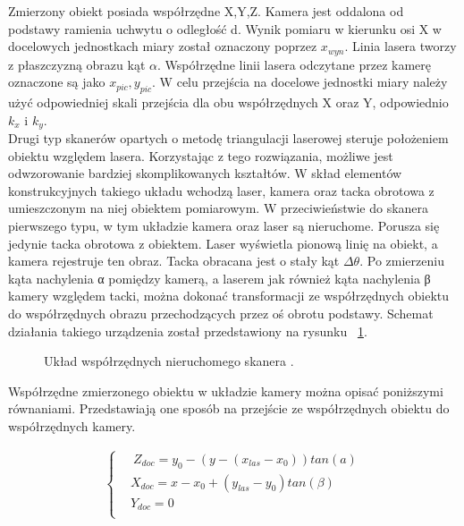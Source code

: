 \noindent Zmierzony obiekt posiada współrzędne X,Y,Z. Kamera jest oddalona od podstawy ramienia uchwytu o odległość d. Wynik pomiaru w kierunku osi X w docelowych jednostkach miary został oznaczony poprzez $x_{wyn}$. Linia lasera tworzy z płaszczyzną obrazu kąt $\alpha$. Współrzędne linii lasera odczytane przez kamerę oznaczone są jako $x_{pic},y_{pic}$. W celu przejścia na docelowe jednostki miary należy użyć odpowiedniej skali przejścia dla obu współrzędnych X oraz Y, odpowiednio $k_{x}$ i $k_{y}$.\\
\indent Drugi typ skanerów opartych o metodę triangulacji laserowej steruje położeniem obiektu względem lasera. Korzystając z tego rozwiązania, możliwe jest odwzorowanie bardziej skomplikowanych kształtów. W skład elementów konstrukcyjnych takiego układu wchodzą laser, kamera oraz tacka obrotowa z umieszczonym na niej obiektem pomiarowym.
W przeciwieństwie do skanera pierwszego typu, w tym układzie kamera oraz laser są nieruchome. Porusza się jedynie tacka obrotowa z obiektem. Laser wyświetla pionową linię na obiekt, a kamera rejestruje ten obraz. Tacka obracana jest o stały kąt $\Delta \theta$. Po zmierzeniu kąta nachylenia α pomiędzy kamerą, a laserem jak również kąta nachylenia β kamery względem tacki, można dokonać transformacji ze współrzędnych obiektu do współrzędnych obrazu przechodzących przez oś obrotu podstawy. Schemat działania takiego urządzenia został przedstawiony na rysunku ~\ref{fig:triangPic2}.

\begin{figure}[H]
  \centering 
      

  \caption{Układ współrzędnych nieruchomego skanera \cite{mikulski2013metody}.}   
  \label{fig:triangPic2}
\end{figure}
\newline
Współrzędne zmierzonego obiektu w układzie kamery można opisać poniższymi równaniami. Przedstawiają one sposób na przejście ze współrzędnych obiektu do współrzędnych kamery.

\begin{equation}
    \begin{aligned}
    \begin{cases}
        & \ Z_{doc}=y_{0}-(y-(x_{las}-x_{0}))tan(a) \\
          & X_{doc}=x-x_{0}+(y_{las}-y_{0})tan(\beta) \\
          & Y_{doc}=0\\
        \end{cases}
        
        \end{aligned}
\end{equation}

